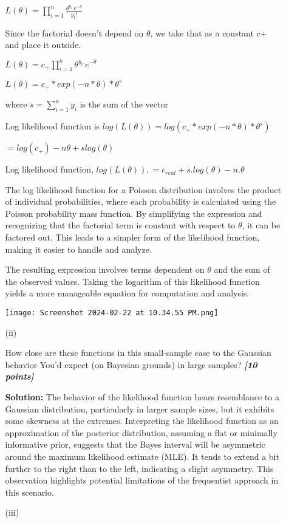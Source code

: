 \documentclass[12pt]{article}
\newcommand{\bi}[1]{\b{\i{#1}}}
\renewcommand{\b}[1]{\textbf{#1}}
\renewcommand{\i}[1]{\textit{#1}}
\begin{document}
\begin{itemize}
\begin{itemize}
{$L(\theta) = \prod_{i=1}^{n}\frac{ \theta^{ y_i } \, e^{ - \theta } }{ y_i ! }$

Since the factorial doesn't depend on $\theta$, we take that as a constant c+ and place it outside.

$L(\theta) = c_{+}\prod_{i=1}^{n}\theta^{ y_i } \, e^{ - \theta } $


$L(\theta) = c_{+} * exp(-n*\theta)* \theta^s$

where $s = \sum_{i=1}^{n}y_i$ is the sum of the vector


Log likelihood function is $log(L(\theta)) = log(c_{+} * exp(-n*\theta)* \theta^s)$

$= log(c_{+}) - n\theta + slog(\theta)$

Log likelihood function, $log(L(\theta)), =c_{real} + s.log(\theta) - n.\theta$

The log likelihood function for a Poisson distribution involves the product of individual probabilities, where each probability is calculated using the Poisson probability mass function. By simplifying the expression and recognizing that the factorial term is constant with respect to \( \theta \), it can be factored out. This leads to a simpler form of the likelihood function, making it easier to handle and analyze.

The resulting expression involves terms dependent on \( \theta \) and the sum of the observed values. Taking the logarithm of this likelihood function yields a more manageable equation for computation and analysis.

\texttt{[image: Screenshot 2024-02-22 at 10.34.55 PM.png]}

}
\item[(ii)]

How close are these functions in this small-sample case to the Gaussian behavior You'd expect (on Bayesian grounds) in large samples? \bi{[10 points]}

{\color{blue} \textbf{Solution:} 
The behavior of the likelihood function bears resemblance to a Gaussian distribution, particularly in larger sample sizes, but it exhibits some skewness at the extremes. Interpreting the likelihood function as an approximation of the posterior distribution, assuming a flat or minimally informative prior, suggests that the Bayes interval will be asymmetric around the maximum likelihood estimate (MLE). It tends to extend a bit further to the right than to the left, indicating a slight asymmetry. This observation highlights potential limitations of the frequentist approach in this scenario. }
\item[(iii)]


\end{itemize}
\end{itemize}
\end{document}
